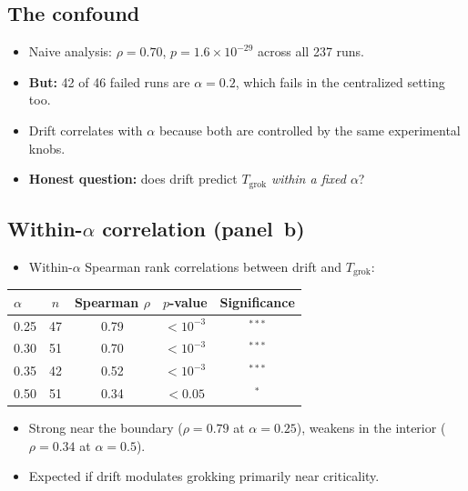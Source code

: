 \documentclass[11pt]{article}
\begin{document}
\subsection{The confound}

\begin{itemize}
  \item Naive analysis: $\rho = 0.70$, $p = 1.6 \times 10^{-29}$
        across all 237 runs.
  \item \textbf{But:} 42 of 46 failed runs are $\alpha{=}0.2$, which fails
        in the centralized setting too.
  \item Drift correlates with $\alpha$ because both are controlled by the
        same experimental knobs.
  \item \textbf{Honest question:} does drift predict $T_{\mathrm{grok}}$
        \emph{within a fixed $\alpha$}?
\end{itemize}

\subsection{Within-$\alpha$ correlation (panel~b)}

\begin{itemize}
  \item Within-$\alpha$ Spearman rank correlations between drift and
        $T_{\mathrm{grok}}$:
\end{itemize}

\begin{center}
\begin{tabular}{lcccc}
\toprule
$\alpha$ & $n$ & Spearman $\rho$ & $p$-value & Significance \\
\midrule
0.25 & 47 & 0.79 & $< 10^{-3}$ & $^{***}$ \\
0.30 & 51 & 0.70 & $< 10^{-3}$ & $^{***}$ \\
0.35 & 42 & 0.52 & $< 10^{-3}$ & $^{***}$ \\
0.50 & 51 & 0.34 & $< 0.05$    & $^{*}$   \\
\bottomrule
\end{tabular}
\end{center}

\begin{itemize}
  \item Strong near the boundary ($\rho = 0.79$ at $\alpha{=}0.25$),
        weakens in the interior ($\rho = 0.34$ at $\alpha{=}0.5$).
  \item Expected if drift modulates grokking primarily near criticality.
\end{itemize}
\end{document}
